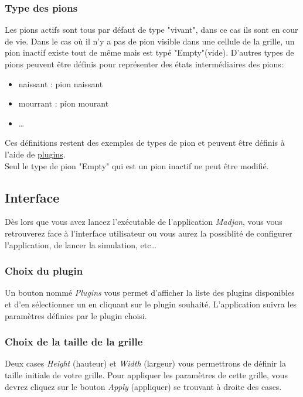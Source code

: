 \documentclass[pdftex,12pt,a4paper]{article}
\begin{document}
      \subsubsection{Type des pions}
      
      Les pions actifs sont tous par défaut de type "vivant", dans ce cas ils sont en cour de vie. Dans le cas où il n'y a pas de pion visible dans une cellule de la grille, un pion inactif existe tout de même mais est typé "Empty"(vide). 
      D'autres types de pions peuvent être définis pour représenter des états intermédiaires des pions: 
      
       \begin{itemize}
	       \item naissant : pion naissant
		   \item mourrant : pion mourant
	       \item \dots
       \end{itemize}
       
	Ces définitions restent des exemples de types de pion et peuvent être définis à l'aide de \hyperref[plugin]{plugins}.\\
    Seul le type de pion "Empty" qui est un pion inactif ne peut être modifié.
	
     \subsection{Interface}
     
      Dès lors que vous avez lancez l'exécutable de l'application \emph{Madjan}, vous vous retrouverez face à l'interface utilisateur ou vous aurez la possiblité de configurer l'application, de lancer la simulation, etc\dots
      
      \subsubsection{Choix du plugin}
     Un bouton nommé \emph{Plugins} vous permet d'afficher la liste des plugins disponibles et d'en sélectionner un en cliquant sur le plugin souhaité. L'application suivra les paramètres définies par le plugin choisi.
     
     \newpage
     \subsubsection{Choix de la taille de la grille}
     
     Deux cases \emph{Height} (hauteur) et \emph{Width} (largeur) vous permettrons de définir la taille initiale de votre grille. Pour appliquer les paramètres de cette grille, vous devrez cliquez sur le bouton \emph{Apply} (appliquer) se trouvant à droite des cases.\\
     
\end{document}
